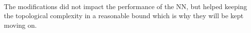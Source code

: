 \begin{figure}[H]
\begin{adjustbox}{valign=c,margin=-5mm 0pt 0pt 0pt}
\begin{minipage}{1.1\textwidth}
\begin{subfigure}[b]{0.45\textwidth}
                \begin{center}
                \end{center}
            \end{subfigure}

        \end{minipage}
    \end{adjustbox}
    \label{fig:performances-1}
\end{figure}
\\
The modifications did not impact the performance of the NN, but helped keeping the topological complexity in a reasonable bound which is why they will be kept moving on.

